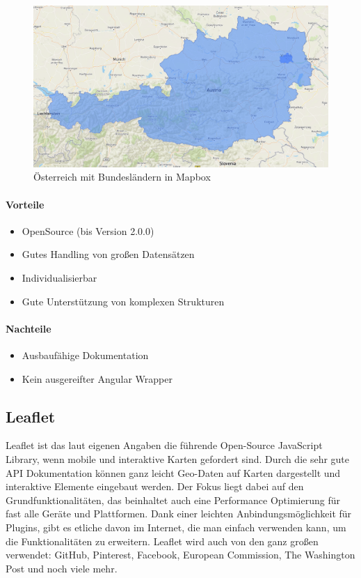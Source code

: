 \begin{figure}[hbt!]
    \centering
    \includegraphics[scale=0.25]{pics/austria-mapbox}
    \caption{Österreich mit Bundesländern in Mapbox}
    \label{fig:austria-mapbox}
\end{figure}

\paragraph{Vorteile}
\begin{itemize}
    \item OpenSource (bis Version 2.0.0)~\cite{mapbox-open-source}
    \item Gutes Handling von großen Datensätzen
    \item Individualisierbar
    \item Gute Unterstützung von komplexen Strukturen
\end{itemize}

\paragraph{Nachteile}
\begin{itemize}
    \item Ausbaufähige Dokumentation
    \item Kein ausgereifter Angular Wrapper
\end{itemize}

\subsection{Leaflet}
Leaflet ist das laut eigenen Angaben die führende Open-Source JavaScript Library, wenn mobile und interaktive Karten gefordert sind.
Durch die sehr gute API Dokumentation können ganz leicht Geo-Daten auf Karten dargestellt und interaktive Elemente eingebaut werden.
Der Fokus liegt dabei auf den Grundfunktionalitäten, das beinhaltet auch eine Performance Optimierung für fast alle Geräte und Plattformen.
Dank einer leichten Anbindungsmöglichkeit für Plugins, gibt es etliche davon im Internet, die man einfach verwenden kann,
um die Funktionalitäten zu erweitern.
Leaflet wird auch von den ganz großen verwendet: GitHub, Pinterest, Facebook, European Commission, The Washington Post und noch viele mehr.
~\cite{leaflet-doc}

